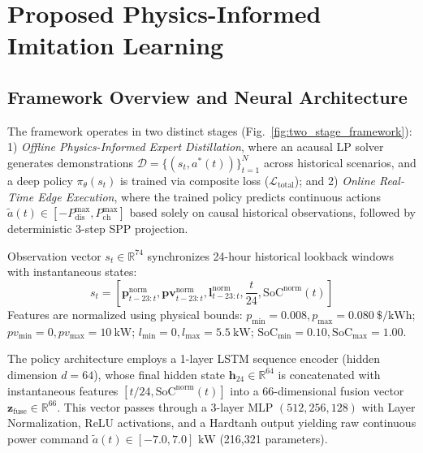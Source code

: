 \documentclass[journal]{IEEEtran}
\theoremstyle{remark}
\begin{document}
\section{Proposed Physics-Informed Imitation Learning}
\subsection{Framework Overview and Neural Architecture}
The framework operates in two distinct stages (Fig.~\ref{fig:two_stage_framework}): 1) \textit{Offline Physics-Informed Expert Distillation}, where an acausal LP solver generates demonstrations $\mathcal{D} = \{(s_t, a^*(t))\}_{t=1}^N$ across historical scenarios, and a deep policy $\pi_\theta(s_t)$ is trained via composite loss ($\mathcal{L}_{\mathrm{total}}$); and 2) \textit{Online Real-Time Edge Execution}, where the trained policy predicts continuous actions $\tilde{a}(t) \in [-P_{\mathrm{dis}}^{\max}, P_{\mathrm{ch}}^{\max}]$ based solely on causal historical observations, followed by deterministic 3-step SPP projection.

Observation vector $s_t \in \mathbb{R}^{74}$ synchronizes 24-hour historical lookback windows with instantaneous states:
\begin{equation}
s_t = \left[ \mathbf{p}^{\mathrm{norm}}_{t-23:t}, \mathbf{pv}^{\mathrm{norm}}_{t-23:t}, \mathbf{l}^{\mathrm{norm}}_{t-23:t}, \frac{t}{24}, \mathrm{SoC}^{\mathrm{norm}}(t) \right]
\label{eq:state_vector}
\end{equation}
Features are normalized using physical bounds: $p_{\min}=0.008, p_{\max}=0.080~\$/\text{kWh}$; $pv_{\min}=0, pv_{\max}=10~\text{kW}$; $l_{\min}=0, l_{\max}=5.5~\text{kW}$; $\mathrm{SoC}_{\min}=0.10, \mathrm{SoC}_{\max}=1.00$.

The policy architecture employs a 1-layer LSTM sequence encoder (hidden dimension $d=64$), whose final hidden state $\mathbf{h}_{24} \in \mathbb{R}^{64}$ is concatenated with instantaneous features $[t/24, \mathrm{SoC}^{\mathrm{norm}}(t)]$ into a 66-dimensional fusion vector $\mathbf{z}_{\mathrm{fuse}} \in \mathbb{R}^{66}$. This vector passes through a 3-layer MLP $(512, 256, 128)$ with Layer Normalization, ReLU activations, and a Hardtanh output yielding raw continuous power command $\tilde{a}(t) \in [-7.0, 7.0]\text{ kW}$ (216,321 parameters).
\end{document}
